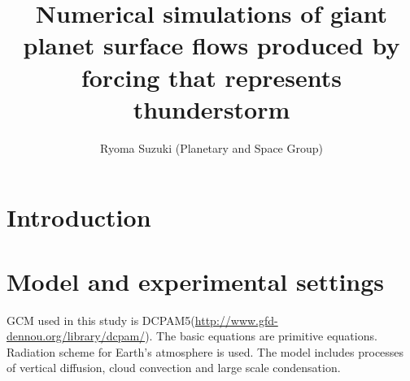 \documentclass[dvipdfmx,twocolumn,10pt]{jsarticle}
\begin{document}
\pagestyle{empty}
\title{\Large Numerical simulations of giant planet surface flows 
produced by forcing that represents thunderstorm 
}

\author{\large Ryoma Suzuki (Planetary and Space Group)}
\date{}
\maketitle
\vspace{-0.2zh}
\section{Introduction}
\vspace{-0.5zh}



\vspace{-0.2zh}
\section{Model and experimental settings}
\vspace{-0.5zh}
GCM used in this study is DCPAM5(\url{http://www.gfd-dennou.org/library/dcpam/}). 
The basic equations are primitive equations. 
Radiation scheme for Earth's atmosphere is used. 
The model includes processes of vertical diffusion, cloud convection and large scale condensation. 
\end{document}
